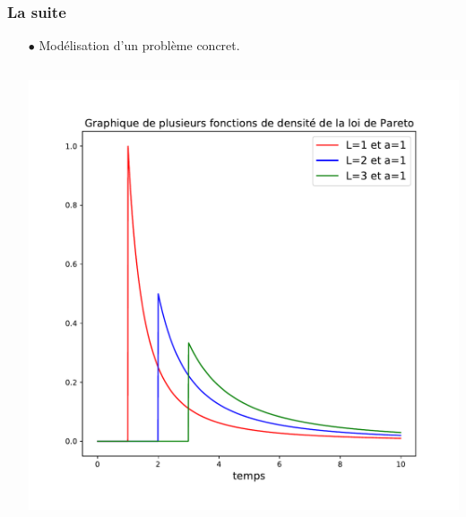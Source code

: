 \documentclass[8pt,sans,aspectratio=169]{beamer}
\begin{document}
\begin{frame}

\frametitle{La suite }

\pause
\vfill

\begin{itemize}

\item[$\bullet$]
Modélisation d'un problème concret.

\begin{columns}[T] %

\begin{column}{0.5\linewidth}
\includegraphics[scale=0.25]{graphiques_Pareto-temps.pdf}
\end{column}%

\hfill
\pause


\end{columns}
\end{itemize}
\end{frame}
\end{document}
